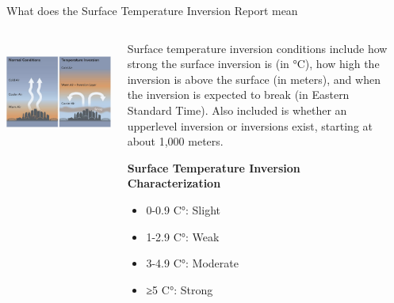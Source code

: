 \documentclass[final,xcolor=table]{beamer}
\newlength{\sepwidth}
\newlength{\colwidth}
\newcommand{\separatorcolumn}{\begin{column}{\sepwidth}\end{column}}
\begin{document}
\begin{frame}[t]
\begin{columns}[t]
\begin{column}{\colwidth}
\begin{block}{What does the Surface Temperature Inversion Report mean}
    \begin{columns}[T]
    \begin{column}{0.43\linewidth}
    ~\includegraphics[width=1\textwidth]{citypic.png}
    \end{column}
    \begin{column}{0.5\linewidth}
    
        Surface temperature inversion conditions include how strong the surface inversion is (in °C), how high the inversion is above the surface (in meters), and when the inversion is expected to break (in Eastern Standard Time). Also included is whether an upperlevel inversion or inversions exist, starting at about 1,000 meters.
        
        \textbf{Surface Temperature Inversion Characterization}
            \begin{itemize}
              \item 0-0.9 C°: Slight
              \item 1-2.9 C°: Weak
              \item 3-4.9 C°: Moderate
              \item ≥5 C°: Strong
            \end{itemize}
    \end{column}
    \end{columns}    


  \end{block}



%


\end{column}

\separatorcolumn
\end{columns}
\end{frame}
\end{document}
